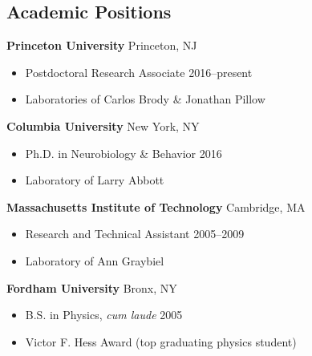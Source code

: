 \documentclass[margin, 10pt]{res}
\begin{document}
\begin{resume}

\vspace{-4mm}
\section{\textnormal\bf{Academic Positions}}

\textbf{Princeton University} \hfill Princeton, NJ\\
\vspace{-3mm}
\begin{itemize}[label={}]
\itemsep-0.25em 
\item Postdoctoral Research Associate \hfill 2016--present
\item Laboratories of Carlos Brody \& Jonathan Pillow\\
\end{itemize}

\vspace{-4mm}
\textbf{Columbia University} \hfill New York, NY\\
\vspace{-3mm}
\begin{itemize}[label={}]
\itemsep-0.25em 
\item Ph.D. in Neurobiology \& Behavior 
\hfill 2016
\item Laboratory of Larry Abbott\\
\end{itemize}

\vspace{-4mm}
\textbf{Massachusetts Institute of Technology} \hfill Cambridge, MA\\
\vspace{-3mm}
\begin{itemize}[label={}]
\itemsep-0.25em 
\item Research and Technical Assistant \hfill 2005--2009
\item Laboratory of Ann Graybiel\\
\end{itemize}

\vspace{-4mm}
\textbf{Fordham University} \hfill Bronx, NY\\
\vspace{-3mm}
\begin{itemize}[label={}]
\itemsep-0.25em 
\item B.S. in Physics, \emph{cum laude} \hfill 2005
\item Victor F. Hess Award (top graduating physics student)\\
\end{itemize}


\end{resume}
\end{document}

